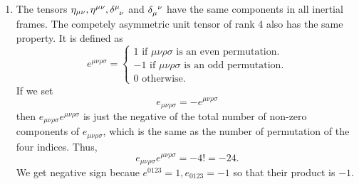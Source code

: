 \begin{enumerate}
\item The tensors $\eta_{\mu\nu}, \eta^{\mu\nu}, \tensor{\delta}{^\mu_\nu}$ and 
$\tensor{\delta}{_\mu^\nu}$ have the same components in all inertial frames. The 
competely asymmetric unit tensor of rank 4 also has the same property. It is
defined as
\begin{equation}\label{c1e52}
e^{\mu\nu\rho\sigma} = \begin{cases}
1 \text{  if  } \mu\nu\rho\sigma \text{  is an even permutation.} \\
-1 \text{  if  } \mu\nu\rho\sigma \text{  is an odd permutation.} \\
0 \text {  otherwise.}
\end{cases}
\end{equation}
If we set
\begin{equation}\label{c1e53}
e_{\mu\nu\rho\sigma} = -e^{\mu\nu\rho\sigma}
\end{equation}
then $e_{\mu\nu\rho\sigma}e^{\mu\nu\rho\sigma}$ is just the negative of the total 
number of non-zero components of $e_{\mu\nu\rho\sigma}$, which is the same as the
number of permutation of the four indices. Thus,
\begin{equation}\label{c1e54}
e_{\mu\nu\rho\sigma}e^{\mu\nu\rho\sigma} = -4! = -24.
\end{equation}
We get negative sign becaue $e^{0123} = 1, e_{0123} = -1$ so that their product 
is $-1$.


\end{enumerate}
